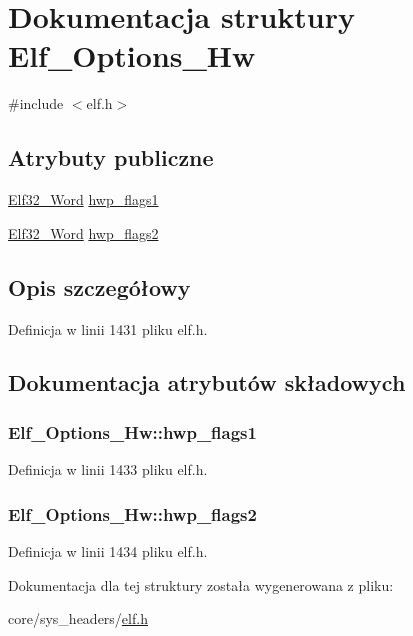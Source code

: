 \hypertarget{struct_elf___options___hw}{\section{Dokumentacja struktury Elf\-\_\-\-Options\-\_\-\-Hw}
\label{struct_elf___options___hw}
}


{\ttfamily \#include $<$elf.\-h$>$}

\subsection*{Atrybuty publiczne}
\begin{DoxyCompactItemize}
\item 
\hyperlink{elf_8h_af5924ece606c732e86f8263a19408e45}{Elf32\-\_\-\-Word} \hyperlink{struct_elf___options___hw_ade844ca291219a4c2ddb9daa5ff7cdc1}{hwp\-\_\-flags1}
\item 
\hyperlink{elf_8h_af5924ece606c732e86f8263a19408e45}{Elf32\-\_\-\-Word} \hyperlink{struct_elf___options___hw_a4940c510ca6158e2ea1df247ffce5882}{hwp\-\_\-flags2}
\end{DoxyCompactItemize}


\subsection{Opis szczegółowy}


Definicja w linii 1431 pliku elf.\-h.



\subsection{Dokumentacja atrybutów składowych}
\hypertarget{struct_elf___options___hw_ade844ca291219a4c2ddb9daa5ff7cdc1}{
\subsubsection[{hwp\-\_\-flags1}]{ Elf\-\_\-\-Options\-\_\-\-Hw\-::hwp\-\_\-flags1}}\label{struct_elf___options___hw_ade844ca291219a4c2ddb9daa5ff7cdc1}


Definicja w linii 1433 pliku elf.\-h.

\hypertarget{struct_elf___options___hw_a4940c510ca6158e2ea1df247ffce5882}{
\subsubsection[{hwp\-\_\-flags2}]{ Elf\-\_\-\-Options\-\_\-\-Hw\-::hwp\-\_\-flags2}}\label{struct_elf___options___hw_a4940c510ca6158e2ea1df247ffce5882}


Definicja w linii 1434 pliku elf.\-h.



Dokumentacja dla tej struktury została wygenerowana z pliku\-:\begin{DoxyCompactItemize}
\item 
core/sys\-\_\-headers/\hyperlink{elf_8h}{elf.\-h}\end{DoxyCompactItemize}
